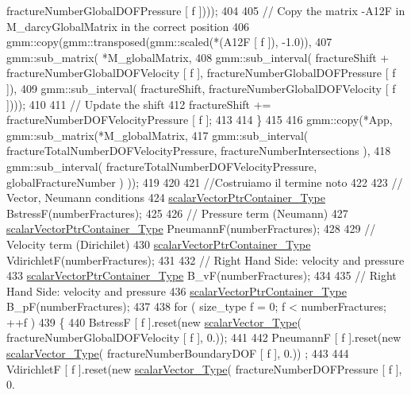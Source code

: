 \begin{DoxyCode}
      fractureNumberGlobalDOFPressure [ f ])));
404 
405         \textcolor{comment}{// Copy the matrix -A12F in M\_darcyGlobalMatrix in the correct position}
406         gmm::copy(gmm::transposed(gmm::scaled(*(A12F [ f ]), -1.0)), 
407                                   gmm::sub\_matrix( *M\_globalMatrix, 
408                                           gmm::sub\_interval( fractureShift + 
      fractureNumberGlobalDOFVelocity [ f ], fractureNumberGlobalDOFPressure [ f ]), 
409                                           gmm::sub\_interval( fractureShift, fractureNumberGlobalDOFVelocity
       [ f ])));
410    
411         \textcolor{comment}{// Update the shift}
412         fractureShift += fractureNumberDOFVelocityPressure [ f ];
413 
414     \}
415 
416     gmm::copy(*App, gmm::sub\_matrix(*M\_globalMatrix, 
417             gmm::sub\_interval( fractureTotalNumberDOFVelocityPressure, fractureNumberIntersections ), 
418             gmm::sub\_interval( fractureTotalNumberDOFVelocityPressure, globalFractureNumber ) ));
419   
420     
421     \textcolor{comment}{//Costruiamo il termine noto}
422     
423     \textcolor{comment}{// Vector, Neumann conditions}
424     \hyperlink{Core_8h_a20f0354ac7b92989514c678f4cdfcb6b}{scalarVectorPtrContainer\_Type} BstressF(numberFractures);
425 
426     \textcolor{comment}{// Pressure term (Neumann)}
427     \hyperlink{Core_8h_a20f0354ac7b92989514c678f4cdfcb6b}{scalarVectorPtrContainer\_Type} PneumannF(numberFractures);
428 
429     \textcolor{comment}{// Velocity term (Dirichilet)}
430     \hyperlink{Core_8h_a20f0354ac7b92989514c678f4cdfcb6b}{scalarVectorPtrContainer\_Type} VdirichletF(numberFractures);
431 
432     \textcolor{comment}{// Right Hand Side: velocity and pressure}
433     \hyperlink{Core_8h_a20f0354ac7b92989514c678f4cdfcb6b}{scalarVectorPtrContainer\_Type} B\_vF(numberFractures);
434 
435     \textcolor{comment}{// Right Hand Side: velocity and pressure}
436     \hyperlink{Core_8h_a20f0354ac7b92989514c678f4cdfcb6b}{scalarVectorPtrContainer\_Type} B\_pF(numberFractures);
437     
438     \textcolor{keywordflow}{for} ( size\_type f = 0; f < numberFractures; ++f )
439     \{
440         BstressF [ f ].reset(\textcolor{keyword}{new} \hyperlink{Core_8h_a4e75b5863535ba1dd79942de2846eff0}{scalarVector\_Type}( fractureNumberGlobalDOFVelocity [ f ],
       0.));
441 
442         PneumannF [ f ].reset(\textcolor{keyword}{new} \hyperlink{Core_8h_a4e75b5863535ba1dd79942de2846eff0}{scalarVector\_Type}( fractureNumberBoundaryDOF [ f ], 0.))
      ;
443 
444         VdirichletF [ f ].reset(\textcolor{keyword}{new} \hyperlink{Core_8h_a4e75b5863535ba1dd79942de2846eff0}{scalarVector\_Type}( fractureNumberDOFPressure [ f ], 0.

\end{DoxyCode}
